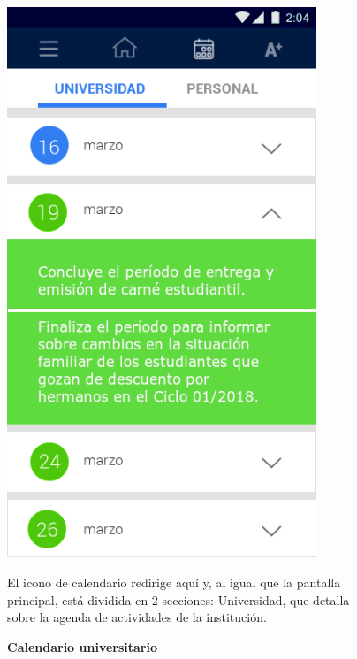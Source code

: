 \documentclass[12pt]{article}
\begin{document}
\begin{figure}[t]
	\begin{minipage}[t]{0.45\textwidth}
		\centering
		\caption{\textbf{Calendario universitario}}
		\includegraphics[width=0.825\textwidth]{img/7.png}
	\end{minipage}\hfill
	\begin{minipage}[t]{0.45\textwidth}
		\vspace*{10mm}
		El icono de calendario redirige aquí y, al igual que la pantalla principal, está dividida en 2 secciones: Universidad, que detalla sobre la agenda de actividades de la institución.
	\end{minipage}
\end{figure}
\end{document}
